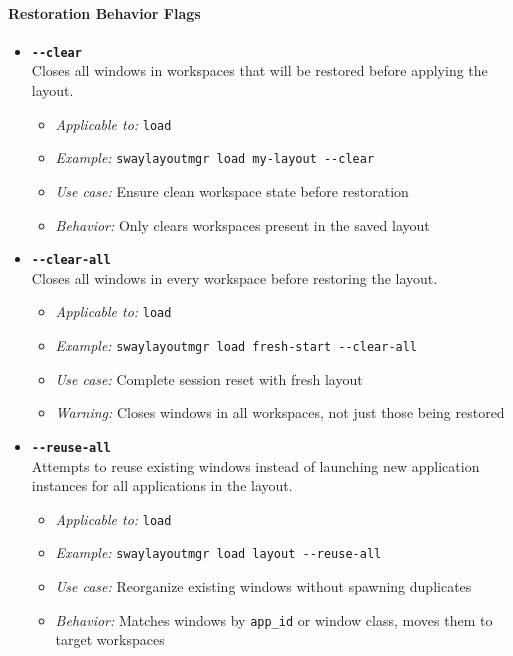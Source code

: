 \paragraph{Restoration Behavior Flags}

\begin{itemize}
    \item \textbf{\texttt{-{}-clear}} \\
    Closes all windows in workspaces that will be restored before applying the layout.
    \begin{itemize}
        \item \textit{Applicable to:} \texttt{load}
        \item \textit{Example:} \texttt{swaylayoutmgr load my-layout -{}-clear}
        \item \textit{Use case:} Ensure clean workspace state before restoration
        \item \textit{Behavior:} Only clears workspaces present in the saved layout
    \end{itemize}

    \item \textbf{\texttt{-{}-clear-all}} \\
    Closes all windows in every workspace before restoring the layout.
    \begin{itemize}
        \item \textit{Applicable to:} \texttt{load}
        \item \textit{Example:} \texttt{swaylayoutmgr load fresh-start -{}-clear-all}
        \item \textit{Use case:} Complete session reset with fresh layout
        \item \textit{Warning:} Closes windows in all workspaces, not just those being restored
    \end{itemize}

    \item \textbf{\texttt{-{}-reuse-all}} \\
    Attempts to reuse existing windows instead of launching new application instances for all applications in the layout.
    \begin{itemize}
        \item \textit{Applicable to:} \texttt{load}
        \item \textit{Example:} \texttt{swaylayoutmgr load layout -{}-reuse-all}
        \item \textit{Use case:} Reorganize existing windows without spawning duplicates
        \item \textit{Behavior:} Matches windows by \texttt{app\_id} or window class, moves them to target workspaces
    \end{itemize}


\end{itemize}
